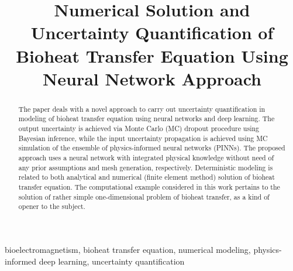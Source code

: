 \documentclass[conference]{IEEEtran}
\begin{document}
\title{Numerical Solution and Uncertainty Quantification of Bioheat Transfer Equation Using Neural Network Approach}
\author{
}

\maketitle

\begin{abstract}
\label{sec.abstract}
The paper deals with a novel approach to carry out uncertainty quantification in modeling of bioheat transfer equation using neural networks and deep learning. The output uncertainty is achieved via Monte Carlo (MC) dropout procedure using Bayesian inference, while the input uncertainty propagation is achieved using MC simulation of the ensemble of physics-informed neural networks (PINNs). The proposed approach uses a neural network with integrated physical knowledge without need of any prior assumptions and mesh generation, respectively. Deterministic modeling is related to both analytical and numerical (finite element method) solution of bioheat transfer equation. The computational example considered in this work pertains to the solution of rather simple one-dimensional problem of bioheat transfer, as a kind of opener to the subject.
\end{abstract}
 
\begin{IEEEkeywords}
bioelectromagnetism, bioheat transfer equation, numerical modeling, physics-informed deep learning, uncertainty quantification
\end{IEEEkeywords}
\end{document}

